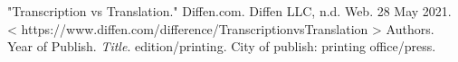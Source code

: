 \documentclass[a4paper,10pt]{article}
\begin{document}
\begin{appendix}
\end{appendix}

\newpage
\begin{thebibliography}{10}

	"Transcription vs Translation." Diffen.com. Diffen LLC, n.d. Web. 28 May 2021. < https://www.diffen.com/difference/Transcription\textunderscore vs\textunderscore Translation >
	Authors. Year of Publish. \textit{Title}. edition/printing. City of publish: printing office/press.
\end{thebibliography}
\end{document}
